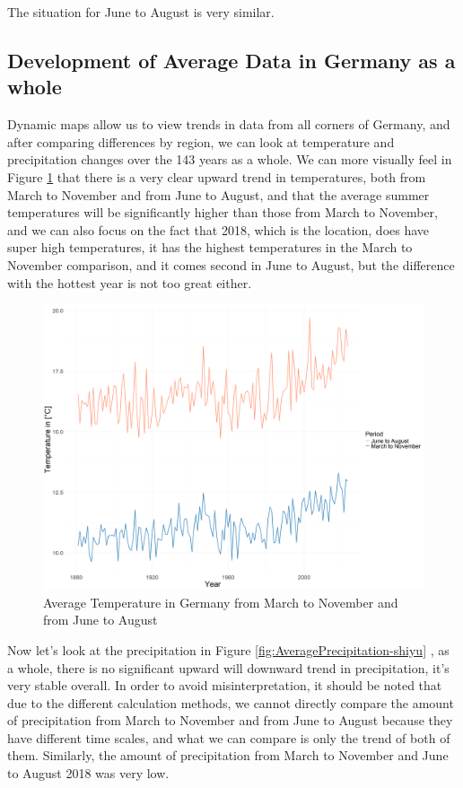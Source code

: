 \documentclass[
]{krantz}
\begin{document}
The situation for June to August is very similar.

\subsection{Development of Average Data in Germany as a whole}\label{development-of-average-data-in-germany-as-a-whole}

Dynamic maps allow us to view trends in data from all corners of Germany, and after comparing differences by region, we can look at temperature and precipitation changes over the 143 years as a whole. We can more visually feel in Figure \ref{fig:AverageTemperature-shiyu} that there is a very clear upward trend in temperatures, both from March to November and from June to August, and that the average summer temperatures will be significantly higher than those from March to November, and we can also focus on the fact that 2018, which is the location, does have super high temperatures, it has the highest temperatures in the March to November comparison, and it comes second in June to August, but the difference with the hottest year is not too great either.

\begin{figure}

{\centering \includegraphics[width=0.7\linewidth]{work/03-compounds/figures/Temperature/Average/Temperature} 

}

\caption{Average Temperature in Germany from March to November and from June to August}\label{fig:AverageTemperature-shiyu}
\end{figure}

Now let's look at the precipitation in Figure \ref{fig:AveragePrecipitation-shiyu} , as a whole, there is no significant upward will downward trend in precipitation, it's very stable overall. In order to avoid misinterpretation, it should be noted that due to the different calculation methods, we cannot directly compare the amount of precipitation from March to November and from June to August because they have different time scales, and what we can compare is only the trend of both of them. Similarly, the amount of precipitation from March to November and June to August 2018 was very low.
\end{document}

